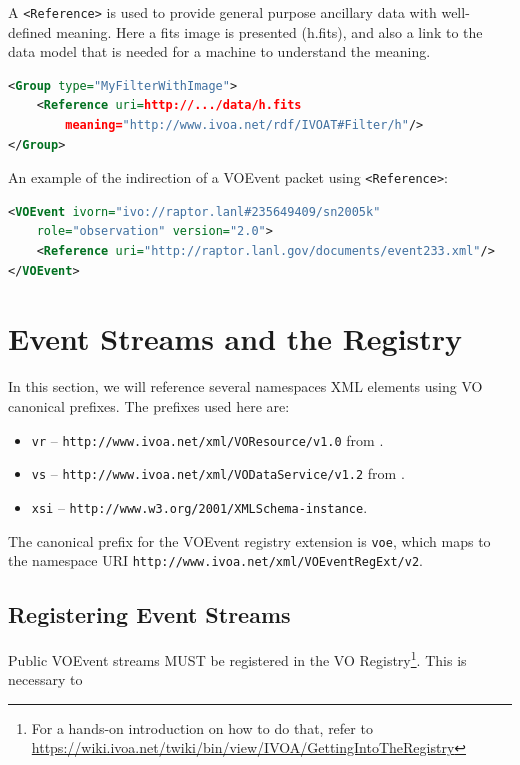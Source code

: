 \documentclass[11pt,a4paper]{ivoa}
\begin{document}
A {\tt <Reference>} is used to provide general purpose ancillary data with 
well-defined meaning. Here a fits image is presented (h.fits), and also a link 
to the data model that is needed for a machine to understand the meaning. 
\begin{lstlisting}[language=XML]
<Group type="MyFilterWithImage">
    <Reference uri=http://.../data/h.fits 
        meaning="http://www.ivoa.net/rdf/IVOAT#Filter/h"/>
</Group> 
\end{lstlisting}
An example of the indirection of a VOEvent packet using {\tt <Reference>}:  
\begin{lstlisting}[language=XML]
<VOEvent ivorn="ivo://raptor.lanl#235649409/sn2005k" 
    role="observation" version="2.0">   
    <Reference uri="http://raptor.lanl.gov/documents/event233.xml"/>
</VOEvent> 
\end{lstlisting}

\section{Event Streams and the Registry}
\label{sec:registry-matters}

In this section, we will reference several namespaces XML elements using
VO canonical prefixes.  The prefixes used here are:

\begin{itemize}
\item \verb|vr| -- \nolinkurl{http://www.ivoa.net/xml/VOResource/v1.0}
from \citet{2018ivoa.spec.0625P}.
\item \verb|vs| --
\nolinkurl{http://www.ivoa.net/xml/VODataService/v1.2}
from \citet{2021ivoa.spec.1102D}.
\item \verb|xsi| --
\nolinkurl{http://www.w3.org/2001/XMLSchema-instance}.
\end{itemize}

The canonical prefix for the VOEvent registry extension is \verb|voe|,
which maps to the namespace URI
\nolinkurl{http://www.ivoa.net/xml/VOEventRegExt/v2}.

\subsection{Registering Event Streams}
\label{sec:registering}

Public VOEvent streams MUST be registered in the VO
Registry\footnote{For a hands-on introduction on how to do that, refer
to
\url{https://wiki.ivoa.net/twiki/bin/view/IVOA/GettingIntoTheRegistry}}.
This is necessary to
\end{document}
